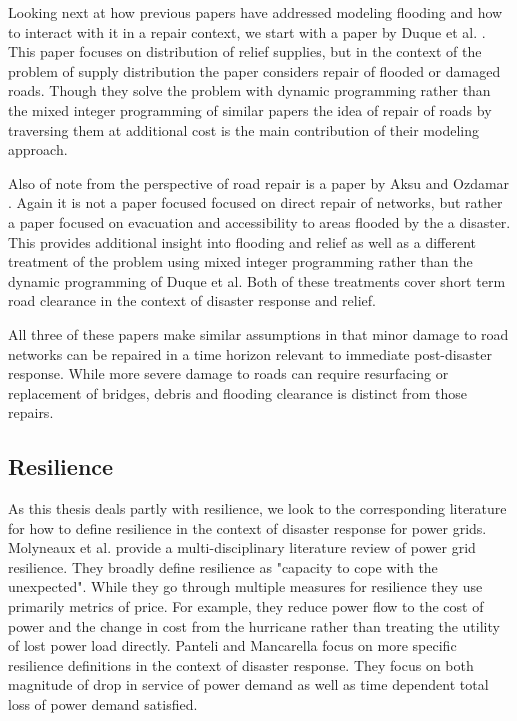 \documentclass{article}
\begin{document}
		Looking next at how previous papers have addressed modeling flooding and how to interact with it in a repair context, we start with a paper by Duque et al. \cite{DuqueEA2016}. This paper focuses on distribution of relief supplies, but in the context of the problem of supply distribution the paper considers repair of flooded or damaged roads. Though they solve the problem with dynamic programming rather than the mixed integer programming of similar papers the idea of repair of roads by traversing them at additional cost is the main contribution of their modeling approach.
		
		Also of note from the perspective of road repair is a paper by Aksu and Ozdamar \cite{AksuEA2014}. Again it is not a paper focused focused on direct repair of networks, but rather a paper focused on evacuation and accessibility to areas flooded by the a disaster. This provides additional insight into flooding and relief as well as a different treatment of the problem using mixed integer programming rather than the dynamic programming of Duque et al. Both of these treatments cover short term road clearance in the context of disaster response and relief. 
		
		All three of these papers make similar assumptions in that minor damage to road networks can be repaired in a time horizon relevant to immediate post-disaster response. While more severe damage to roads can require resurfacing or replacement of bridges, debris and flooding clearance is distinct from those repairs.
	
	\subsection{Resilience}
		As this thesis deals partly with resilience, we look to the corresponding literature for how to define resilience in the context of disaster response for power grids. Molyneaux et al. \cite{MolyneauxEA2016} provide a multi-disciplinary literature review of power grid resilience. They broadly define resilience as "capacity to cope with the unexpected". While they go through multiple measures for resilience they use primarily metrics of price. For example, they reduce power flow to the cost of power and the change in cost from the hurricane rather than treating the utility of lost power load directly. Panteli and Mancarella \cite{Panteli2017} focus on more specific resilience definitions in the context of disaster response. They focus on both magnitude of drop in service of power demand as well as time dependent total loss of power demand satisfied.
		
\end{document}
